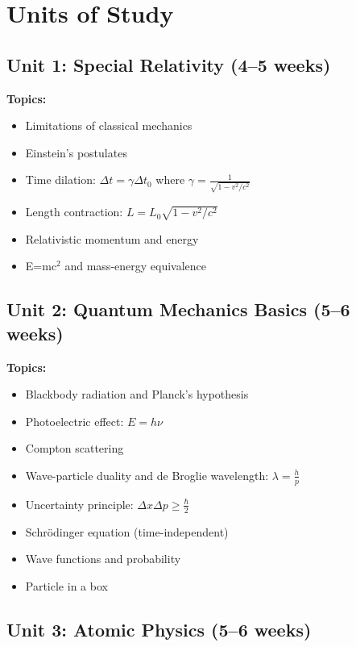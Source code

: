 \documentclass[12pt,oneside]{book}
\begin{document}
\section{Units of Study}

\subsection{Unit 1: Special Relativity (4--5 weeks)}

\textbf{Topics:}
\begin{itemize}
    \item Limitations of classical mechanics
    \item Einstein's postulates
    \item Time dilation: $\Delta t = \gamma \Delta t_0$ where $\gamma = \frac{1}{\sqrt{1-v^2/c^2}}$
    \item Length contraction: $L = L_0\sqrt{1-v^2/c^2}$
    \item Relativistic momentum and energy
    \item E=mc$^2$ and mass-energy equivalence
\end{itemize}

\subsection{Unit 2: Quantum Mechanics Basics (5--6 weeks)}

\textbf{Topics:}
\begin{itemize}
    \item Blackbody radiation and Planck's hypothesis
    \item Photoelectric effect: $E = h\nu$
    \item Compton scattering
    \item Wave-particle duality and de Broglie wavelength: $\lambda = \frac{h}{p}$
    \item Uncertainty principle: $\Delta x \Delta p \geq \frac{\hbar}{2}$
    \item Schrödinger equation (time-independent)
    \item Wave functions and probability
    \item Particle in a box
\end{itemize}

\subsection{Unit 3: Atomic Physics (5--6 weeks)}
\end{document}
